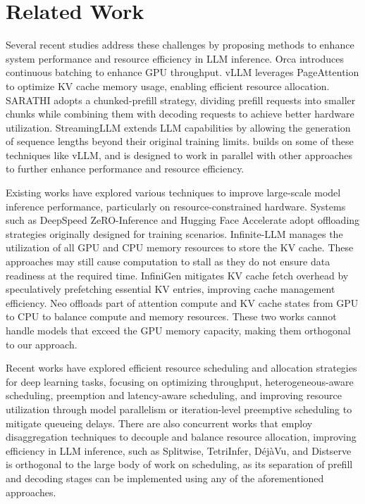 \section{Related Work}
\label{sec:relwk}

Several recent studies address these challenges by proposing methods to enhance system performance and resource efficiency in LLM inference. 
Orca\cite{orca} introduces continuous batching to enhance GPU throughput. 
vLLM\cite{vllm} leverages PageAttention to optimize KV cache memory usage, enabling efficient resource allocation. 
SARATHI\cite{SARATHI} adopts a chunked-prefill strategy, dividing prefill requests into smaller chunks while combining them with decoding requests to achieve better hardware utilization. 
StreamingLLM\cite{StreamingLLM} extends LLM capabilities by allowing the generation of sequence lengths beyond their original training limits. 
\sys builds on some of these techniques like vLLM, and is designed to work in parallel with other approaches to further enhance performance and resource efficiency.

Existing works have explored various techniques to improve large-scale model inference performance, particularly on resource-constrained hardware. 
Systems such as DeepSpeed ZeRO-Inference\cite{zero-infer} and Hugging Face Accelerate\cite{huggingface} adopt offloading strategies originally designed for training scenarios. 
Infinite-LLM\cite{lin2024infinitellmefficientllmservice} manages the utilization of all GPU and CPU memory resources to store the KV cache.
These approaches may still cause computation to stall as they do not ensure data readiness at the required time.
InfiniGen\cite{infinigen} mitigates KV cache fetch overhead by speculatively prefetching essential KV entries, improving cache management efficiency. 
Neo\cite{jiangxuanlin} offloads part of attention compute and KV cache states from GPU to CPU to balance compute and memory resources.
These two works cannot handle models that exceed the GPU memory capacity, making them orthogonal to our approach.

Recent works have explored efficient resource scheduling and allocation strategies for deep learning tasks, focusing on optimizing throughput\cite{pollux}, 
heterogeneous-aware scheduling\cite{sia}, preemption and latency-aware scheduling\cite{Clockwork, SHEPHERD}, 
and improving resource utilization through model parallelism\cite{AlpaServe} or iteration-level preemptive scheduling to mitigate queueing delays\cite{fastserve}.
There are also concurrent works that employ disaggregation techniques to decouple and balance resource allocation, 
improving efficiency in LLM inference, such as Splitwise\cite{splitwise}, TetriInfer\cite{TetriInfer}, DéjàVu\cite{dejavu}, and Distserve\cite{distserve}
\sys is orthogonal to the large body of work on scheduling, as its separation of prefill and decoding stages can be implemented using any of the aforementioned approaches.